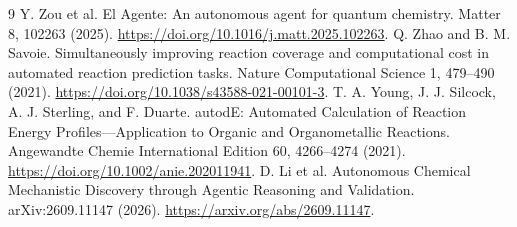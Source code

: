 \documentclass[11pt,a4paper]{article}
\begin{document}
\begin{thebibliography}{9}
 Y. Zou et al. El Agente: An autonomous agent for quantum chemistry. Matter 8, 102263 (2025). \url{https://doi.org/10.1016/j.matt.2025.102263}.
 Q. Zhao and B. M. Savoie. Simultaneously improving reaction coverage and computational cost in automated reaction prediction tasks. Nature Computational Science 1, 479--490 (2021). \url{https://doi.org/10.1038/s43588-021-00101-3}.
 T. A. Young, J. J. Silcock, A. J. Sterling, and F. Duarte. autodE: Automated Calculation of Reaction Energy Profiles---Application to Organic and Organometallic Reactions. Angewandte Chemie International Edition 60, 4266--4274 (2021). \url{https://doi.org/10.1002/anie.202011941}.
 D. Li et al. Autonomous Chemical Mechanistic Discovery through Agentic Reasoning and Validation. arXiv:2609.11147 (2026). \url{https://arxiv.org/abs/2609.11147}.
\end{thebibliography}
\end{document}
